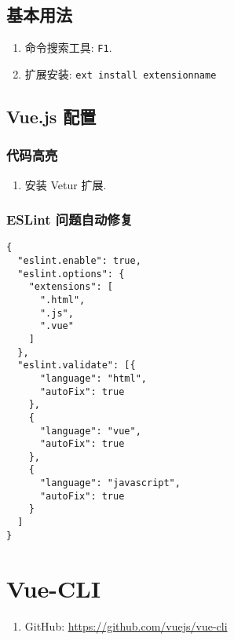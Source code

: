 \subsection{基本用法}\label{ux57faux672cux7528ux6cd5}

\begin{enumerate}
\def\labelenumi{\arabic{enumi}.}
\tightlist
\item
  命令搜索工具: \lstinline!F1!.
\item
  扩展安装: \lstinline!ext install extensionname!
\end{enumerate}

\subsection{Vue.js 配置}\label{vue.js-ux914dux7f6e}

\subsubsection{代码高亮}\label{ux4ee3ux7801ux9ad8ux4eae}

\begin{enumerate}
\def\labelenumi{\arabic{enumi}.}
\tightlist
\item
  安装 Vetur 扩展.
\end{enumerate}

\subsubsection{ESLint
问题自动修复}\label{eslint-ux95eeux9898ux81eaux52a8ux4feeux590d}

\begin{lstlisting}
{
  "eslint.enable": true,
  "eslint.options": {
    "extensions": [
      ".html",
      ".js",
      ".vue"
    ]
  },
  "eslint.validate": [{
      "language": "html",
      "autoFix": true
    },
    {
      "language": "vue",
      "autoFix": true
    },
    {
      "language": "javascript",
      "autoFix": true
    }
  ]
}
\end{lstlisting}

\section{Vue-CLI}\label{vue-cli}

\begin{enumerate}
\def\labelenumi{\arabic{enumi}.}
\tightlist
\item
  GitHub: \url{https://github.com/vuejs/vue-cli}
\end{enumerate}

